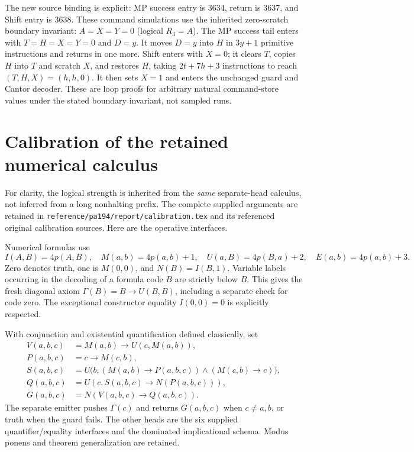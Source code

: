 \documentclass[11pt,letterpaper]{article}
\newcommand{\file}[1]{\texttt{\nolinkurl{#1}}}
\begin{document}
The new source binding is explicit: MP success entry is 3634, return is 3637,
and Shift entry is 3638. These command simulations use the inherited
zero-scratch boundary invariant: $A=X=Y=0$ (logical $R_3=A$). The MP success tail enters
with $T=H=X=Y=0$ and $D=y$. It moves $D=y$ into $H$ in $3y+1$
primitive instructions and returns in one more. Shift enters with $X=0$;
it clears $T$, copies $H$
into $T$ and scratch $X$, and restores $H$, taking $2t+7h+3$ instructions to
reach $(T,H,X)=(h,h,0)$. It then sets $X=1$ and enters the unchanged guard and
Cantor decoder. These are loop proofs for arbitrary natural command-store
values under the stated boundary invariant, not sampled runs.

\section{Calibration of the retained numerical calculus}
\label{sec:calibration}

For clarity, the logical strength is inherited from the \emph{same} separate-head
calculus, not inferred from a long nonhalting prefix. The complete supplied
arguments are retained in \file{reference/pa194/report/calibration.tex} and
its referenced original calibration sources. Here are the operative interfaces.

Numerical formulas use
\[
 I(A,B)=4p(A,B),\quad M(a,b)=4p(a,b)+1,\quad
 U(a,B)=4p(B,a)+2,\quad E(a,b)=4p(a,b)+3.
\]
Zero denotes truth, one is $M(0,0)$, and $N(B)=I(B,1)$. Variable labels
occurring in the decoding of a formula code $B$ are strictly below $B$.
This gives the fresh diagonal axiom $\Gamma(B)=B\to U(B,B)$, including a
separate check for code zero. The exceptional constructor equality $I(0,0)=0$
is explicitly respected.

With conjunction and existential quantification defined classically, set
\[
\begin{aligned}
 V(a,b,c)&=M(a,b)\to U(c,M(a,b)),\\
 P(a,b,c)&=c\to M(c,b),\\
 S(a,b,c)&=U\bigl(b,(M(a,b)\to P(a,b,c))\wedge(M(c,b)\to c)\bigr),\\
 Q(a,b,c)&=U(c,S(a,b,c)\to N(P(a,b,c))),\\
 G(a,b,c)&=N(V(a,b,c)\to Q(a,b,c)).
\end{aligned}
\]
The separate emitter pushes $\Gamma(c)$ and returns $G(a,b,c)$ when
$c\ne a,b$, or truth when the guard fails. The other heads are the six
supplied quantifier/equality interfaces and the dominated implicational
schema. Modus ponens and theorem generalization are retained.
\end{document}
